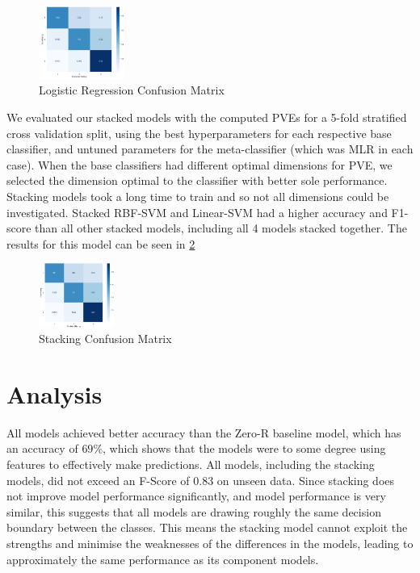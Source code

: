 \documentclass[11pt]{article}
\newcommand{\drafting}[1]{\textcolor{OliveGreen}{#1}}
\begin{document}
\begin{figure}
	\centering
	\includegraphics[width = 0.25\textwidth]{fig-lr-cm.png}
	\caption{Logistic Regression Confusion Matrix}
	\label{fig:lr-cm}
\end{figure}


\drafting{We evaluated our stacked models with the computed PVEs for a 5-fold stratified cross validation split, using the best hyperparameters for each respective base classifier, and untuned parameters for the meta-classifier (which was MLR in each case). When the base classifiers had different optimal dimensions for PVE, we selected the dimension optimal to the classifier with better sole performance. Stacking models took a long time to train and so not all dimensions could be investigated. Stacked RBF-SVM and Linear-SVM had a higher accuracy and F1-score than all other stacked models, including all 4 models stacked together. The results for this model can be seen in \ref{fig:stack-cm}}
\begin{figure}
	\centering
	\includegraphics[width = 0.22\textwidth]{fig-stack-cm.png}
	\caption{Stacking Confusion Matrix}
	\label{fig:stack-cm}
\end{figure}

\section{Analysis}
All models achieved better accuracy than the Zero-R baseline model, which has an accuracy of $69 \%$, which shows that the models were to some degree using features to effectively make predictions. All models, including the stacking models, did not exceed an F-Score of 0.83 on unseen data. Since stacking does not improve model performance significantly, and model performance is very similar, this suggests that all models are drawing roughly the same decision boundary between the classes. This means the stacking model cannot exploit the strengths and minimise the weaknesses of the differences in the models, leading to approximately the same performance as its component models. 
\end{document}
